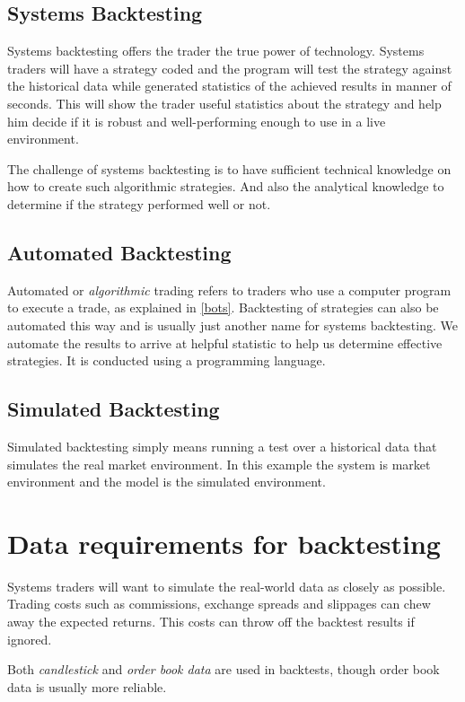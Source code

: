 \subsection*{Systems Backtesting}
Systems backtesting offers the trader the true power of technology. Systems traders will have a strategy coded and the program will test the strategy against the historical data while generated statistics of the achieved results in manner of seconds. This will show the trader useful statistics about the strategy and help him decide if it is robust and well-performing enough to use in a live environment.

The challenge of systems backtesting is to have sufficient technical knowledge on how to create such algorithmic strategies. And also the analytical knowledge to determine if the strategy performed well or not.

\subsection*{Automated Backtesting}
Automated or \emph{algorithmic} trading refers to traders who use a computer program to execute a trade, as explained in \ref{bots}. Backtesting of strategies can also be automated this way and is usually just another name for systems backtesting. We automate the results to arrive at helpful statistic to help us determine effective strategies. It is conducted using a programming language.

\subsection*{Simulated Backtesting}
Simulated backtesting simply means running a test over a historical data that simulates the real market environment. In this example the system is market environment and the model is the simulated environment.


\section{Data requirements for backtesting}
Systems traders will want to simulate the real-world data as closely as possible. Trading costs such as commissions, exchange spreads and slippages can chew away the expected returns. This costs can throw off the backtest results if ignored.

Both \emph{candlestick} and \emph{order book data} are used in backtests, though order book data is usually more reliable.

